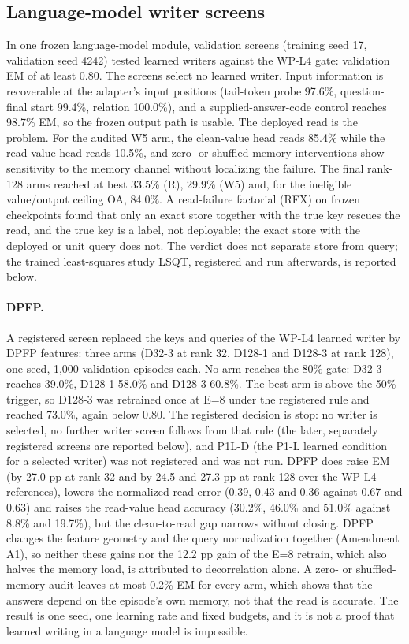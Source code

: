 \subsection{Language-model writer screens}

In one frozen language-model module, validation screens (training seed 17, validation seed 4242) tested learned writers against the WP-L4 gate: validation EM of at least 0.80.
The screens select no learned writer.  %
Input information is recoverable at the adapter's input positions (tail-token probe 97.6\%, question-final start 99.4\%, relation 100.0\%), and a supplied-answer-code control reaches 98.7\% EM, so the frozen output path is usable.  %
The deployed read is the problem.
For the audited W5 arm, the clean-value head reads 85.4\% while the read-value head reads 10.5\%, and zero- or shuffled-memory interventions show sensitivity to the memory channel without localizing the failure.  %
The final rank-128 arms reached at best 33.5\% (R), 29.9\% (W5) and, for the ineligible value/output ceiling OA, 84.0\%.  %
A read-failure factorial (RFX) on frozen checkpoints found that only an exact store together with the true key rescues the read, and the true key is a label, not deployable; the exact store with the deployed or unit query does not.  %
The verdict does not separate store from query; the trained least-squares study LSQT, registered and run afterwards, is reported below.  %

\paragraph{DPFP.}
A registered screen replaced the keys and queries of the WP-L4 learned writer by DPFP features: three arms (D32-3 at rank 32, D128-1 and D128-3 at rank 128), one seed, 1,000 validation episodes each.  %
No arm reaches the 80\% gate: D32-3 reaches 39.0\%, D128-1 58.0\% and D128-3 60.8\%.  %
The best arm is above the 50\% trigger, so D128-3 was retrained once at E=8 under the registered rule and reached 73.0\%, again below 0.80.  %
The registered decision is stop: no writer is selected, no further writer screen follows from that rule (the later, separately registered screens are reported below), and P1L-D (the P1-L learned condition for a selected writer) was not registered and was not run.  %
DPFP does raise EM (by 27.0 pp at rank 32 and by 24.5 and 27.3 pp at rank 128 over the WP-L4 references), lowers the normalized read error (0.39, 0.43 and 0.36 against 0.67 and 0.63) and raises the read-value head accuracy (30.2\%, 46.0\% and 51.0\% against 8.8\% and 19.7\%), but the clean-to-read gap narrows without closing.  %
DPFP changes the feature geometry and the query normalization together (Amendment A1), so neither these gains nor the 12.2 pp gain of the E=8 retrain, which also halves the memory load, is attributed to decorrelation alone.  %
A zero- or shuffled-memory audit leaves at most 0.2\% EM for every arm, which shows that the answers depend on the episode's own memory, not that the read is accurate.  %
The result is one seed, one learning rate and fixed budgets, and it is not a proof that learned writing in a language model is impossible.  %

